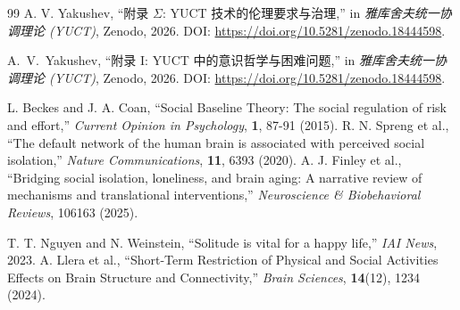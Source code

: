 \documentclass[12pt,a4paper]{article}
\begin{document}
\begin{thebibliography}{99}
		 A. V. Yakushev, ``附录 \(\Sigma\): YUCT 技术的伦理要求与治理,'' in \emph{雅库舍夫统一协调理论 (YUCT)}, Zenodo, 2026. DOI: \url{https://doi.org/10.5281/zenodo.18444598}.
		
		 A.~V.~Yakushev, ``附录 I: YUCT 中的意识哲学与困难问题,'' in \emph{雅库舍夫统一协调理论 (YUCT)}, Zenodo, 2026. DOI: \url{https://doi.org/10.5281/zenodo.18444598}.
		
		 L. Beckes and J. A. Coan, ``Social Baseline Theory: The social regulation of risk and effort,'' \emph{Current Opinion in Psychology}, \textbf{1}, 87-91 (2015).
		 R. N. Spreng et al., ``The default network of the human brain is associated with perceived social isolation,'' \emph{Nature Communications}, \textbf{11}, 6393 (2020).
		 A. J. Finley et al., ``Bridging social isolation, loneliness, and brain aging: A narrative review of mechanisms and translational interventions,'' \emph{Neuroscience \& Biobehavioral Reviews}, 106163 (2025).
		
		 T. T. Nguyen and N. Weinstein, ``Solitude is vital for a happy life,'' \emph{IAI News}, 2023.
		 A. Llera et al., ``Short-Term Restriction of Physical and Social Activities Effects on Brain Structure and Connectivity,'' \emph{Brain Sciences}, \textbf{14}(12), 1234 (2024).
		
		\end{thebibliography}
		
	
\end{document}

